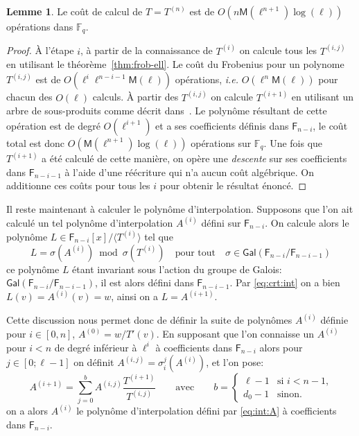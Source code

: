 \documentclass[10pt,a4paper]{book}
\theoremstyle{plain}
\theoremstyle{definition}
\newtheorem{lem}[thm]{Lemme}
\theoremstyle{definition}
\theoremstyle{definition}
\theoremstyle{definition}
\theoremstyle{remark}
\theoremstyle{remark}
\theoremstyle{definition}
\begin{document}
\begin{lem}\label{lemma:interpolation:minpoly}
  Le coût de calcul de $T=T^{(n)}$ est de $O(n\mathsf{M}(\ell^{n+1})\log(\ell))$
  opérations dans $\mathbb{F}_q$.
\end{lem}

\begin{proof}
  \`A l'étape $i$, à partir de la connaissance de $T^{(i)}$ on  calcule tous 
  les $T^{(i,j)}$ en utilisant le théorème~\ref{thm:frob-ell}. Le coût du 
  Frobenius pour un polynome $T^{(i,j)}$ est de 
  $O(\ell^i\ell^{n-i-1}\mathsf{M}(\ell))$ opérations,
  \emph{i.e.} $O(\ell^n\mathsf{M}(\ell))$ pour chacun des $O(\ell)$ calculs.
  \`A partir des $T^{(i,j)}$ on calcule $T^{(i+1)}$ en utilisant un arbre de 
  sous-produits comme décrit dans~\cite[Lemma~10.4]{vzGJG03}. Le polynôme 
  résultant de cette opération est de degré $O(\ell^{i+1})$ et a ses 
  coefficients définis dans $\mathsf{F}_{n-i}$, le coût total est donc 
  $O(\mathsf{M}(\ell^{n+1})\log(\ell))$ opérations sur $\mathbb{F}_q$. Une fois
   que $T^{(i+1)}$ a été calculé de cette manière, on opère une \emph{descente}
  sur ses coefficients dans $\mathsf{F}_{n-i-1}$ à l'aide d'une réécriture 
  qui n'a aucun coût algébrique.
  On additionne ces coûts pour tous les $i$ pour obtenir le résultat 
  énoncé. 
\end{proof}

Il reste maintenant à calculer le polynôme d'interpolation. Supposons que l'on 
ait calculé un tel polynôme d'interpolation $A^{(i)}$ défini sur 
$\mathsf{F}_{n-i}$. On calcule alors le polynôme $L \in \mathsf{F}_{n-i}[x]/ 
\langle T^{(i)} \rangle$ tel que 
\begin{equation}
\label{eq:crt:int}
L= \sigma(A^{(i)}) \bmod \sigma(T^{(i)}) \quad \text{pour tout} \quad \sigma \in 
\mathsf{Gal}(\mathsf{F}_{n-i}/ \mathsf{F}_{n-i-1}) 
\end{equation} 
ce polynôme $L$ étant invariant sous l'action du groupe de Galois: 
$\mathsf{Gal}(\mathsf{F}_{n-i}/ \mathsf{F}_{n-i-1})$, il est alors défini dans
 $\mathsf{F}_{n-i-1}$. Par \ref{eq:crt:int} on a bien $L(v)=A^{(i)}(v)=w$, 
 ainsi on a $L=A^{(i+1)}$. 
 
 Cette discussion nous permet donc de définir la suite de polynômes $A^{(i)}$ 
 définie pour $i \in [0, n]$, $A^{(0)}=w/T'(v)$. En 
 supposant que l'on connaisse un $A^{(i)}$ pour $i < n$ de degré inférieur à $\ell^i$ à 
 coefficients dans $\mathsf{F}_{n-i}$ alors pour $j \in [0 ; \ell-1]$ on définit
 $A^{(i,j)}=\sigma_i^j(A^{(i)})$, et l'on pose:  
\begin{equation*}
A^{(i+1)}=\sum_{j=0}^{b}A^{(i,j)}\frac{T^{(i+1)}}{T^{(i,j)}} \qquad\text{avec}\qquad
  b = \begin{cases}
    \ell-1 &\text{si $i<n-1$,}\\
    d_0 -1 &\text{sinon.}
  \end{cases}
\end{equation*}
on a alors $A^{(i)}$ le polynôme d'interpolation défini par \ref{eq:int:A} 
à coefficients dans $\mathsf{F}_{n-i}$.
\end{document}
